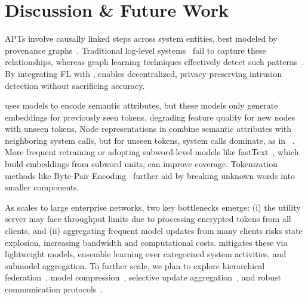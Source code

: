 \section{Discussion \& Future Work}
\label{sec:discussion}





APTs involve causally linked steps across system entities, best modeled by provenance graphs~\cite{inam2023sok}. Traditional log-level systems~\cite{deeplog2017,liu2019log2vec,xia2019loggan} fail to capture these relationships, whereas graph learning techniques effectively detect such patterns~\cite{flash2024,cheng2023kairos,jia2023magic}. By integrating FL with \gnnshort, \Sys enables decentralized, privacy-preserving intrusion detection without sacrificing accuracy.

 \Sys uses \wordvec models to encode semantic attributes, but these models only generate embeddings for previously seen tokens, degrading feature quality for new nodes with unseen tokens. Node representations in \Sys combine semantic attributes with neighboring system calls, but for unseen tokens, system calls dominate, as in \threatrace~\cite{wang2022threatrace}. More frequent \wordvec retraining or adopting subword-level models like fastText~\cite{joulin2016bag}, which build embeddings from subword units, can improve coverage. Tokenization methods like Byte-Pair Encoding~\cite{araabi2022effective} further aid by breaking unknown words into smaller components.

As \Sys scales to large enterprise networks, two key bottlenecks emerge: (i) the utility server may face throughput limits due to processing encrypted tokens from all clients, and (ii) aggregating frequent model updates from many clients risks state explosion, increasing bandwidth and computational costs. \Sys mitigates these via lightweight models, ensemble learning over categorized system activities, and submodel aggregation. To further scale, we plan to explore hierarchical federation~\cite{zhong2022flee}, model compression~\cite{choudhary2020comprehensive}, selective update aggregation~\cite{ye2020federated}, and robust communication protocols~\cite{laclau2020robust}.

